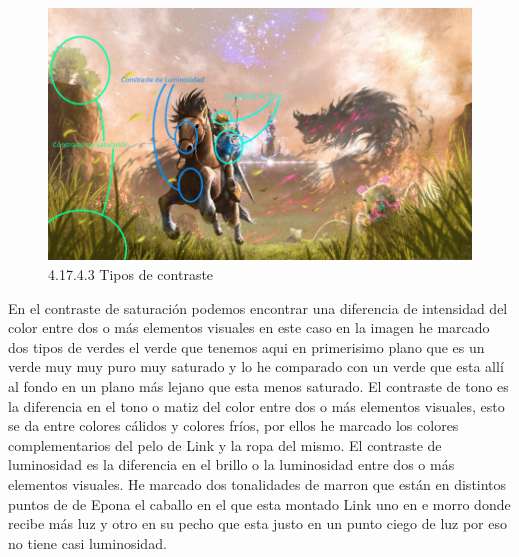 \documentclass[12pt]{article}
\begin{document}
        \begin{figure}[H]
          \centering
          \includegraphics[scale=0.7]{images/Saúl/Sección 17/EA_img17_4Color_3Contrastes.png}
          \caption{\small 4.17.4.3 Tipos de contraste}
        \end{figure}
        En el contraste de saturación podemos encontrar una diferencia de intensidad del color entre dos o más elementos visuales en este caso en la imagen he marcado dos tipos de verdes el verde que tenemos aqui en primerisimo plano que es un verde muy muy puro muy saturado y lo he comparado con un verde que esta allí al fondo en un plano más lejano que esta menos saturado. El contraste de tono es la diferencia en el tono o matiz del color entre dos o más elementos visuales, esto se da entre colores cálidos y colores fríos, por ellos he marcado los colores complementarios del pelo de Link y la ropa del mismo. El contraste de luminosidad es la diferencia en el brillo o la luminosidad entre dos o más elementos visuales. He marcado dos tonalidades de marron que están en distintos puntos de de Epona el caballo en el que esta montado Link uno en e morro donde recibe más luz y otro en su pecho que esta justo en un punto ciego de luz por eso no tiene casi luminosidad.
\end{document}
